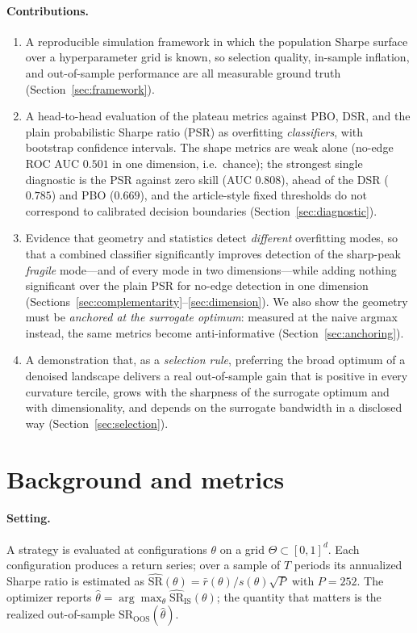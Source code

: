 \documentclass[11pt]{article}
\newcommand{\sr}{\mathrm{SR}}
\newcommand{\theyll}{\theta}
\begin{document}
\paragraph{Contributions.}
\begin{enumerate}\itemsep2pt
\item A reproducible simulation framework in which the population Sharpe surface
over a hyperparameter grid is known, so selection quality, in-sample inflation,
and out-of-sample performance are all measurable ground truth
(Section~\ref{sec:framework}).
\item A head-to-head evaluation of the plateau metrics against PBO, DSR, and the
plain probabilistic Sharpe ratio (PSR) as overfitting \emph{classifiers}, with
bootstrap confidence intervals. The shape metrics are weak alone (no-edge ROC
AUC $0.501$ in one dimension, i.e.\ chance); the strongest single diagnostic is
the PSR against zero skill (AUC $0.808$), ahead of the DSR ($0.785$) and PBO
($0.669$), and the article-style fixed thresholds do not correspond to
calibrated decision boundaries (Section~\ref{sec:diagnostic}).
\item Evidence that geometry and statistics detect \emph{different} overfitting
modes, so that a combined classifier significantly improves detection of the
sharp-peak \emph{fragile} mode---and of every mode in two dimensions---while
adding nothing significant over the plain PSR for no-edge detection in one
dimension (Sections~\ref{sec:complementarity}--\ref{sec:dimension}). We also
show the geometry must be \emph{anchored at the surrogate optimum}: measured at
the naive argmax instead, the same metrics become anti-informative
(Section~\ref{sec:anchoring}).
\item A demonstration that, as a \emph{selection rule}, preferring the broad
optimum of a denoised landscape delivers a real out-of-sample gain that is
positive in every curvature tercile, grows with the sharpness of the surrogate
optimum and with dimensionality, and depends on the surrogate bandwidth in a
disclosed way (Section~\ref{sec:selection}).
\end{enumerate}

\section{Background and metrics}
\label{sec:background}

\paragraph{Setting.} A strategy is evaluated at configurations $\theyll$ on a
grid $\Theta \subset [0,1]^d$. Each configuration produces a return series; over a
sample of $T$ periods its annualized Sharpe ratio is estimated as
$\widehat{\sr}(\theyll) = \bar r(\theyll)/s(\theyll)\sqrt{P}$ with $P=252$. The
optimizer reports $\hat\theyll = \arg\max_{\theyll} \widehat{\sr}_{\text{IS}}(\theyll)$;
the quantity that matters is the realized out-of-sample $\sr_{\text{OOS}}(\hat\theyll)$.
\end{document}
